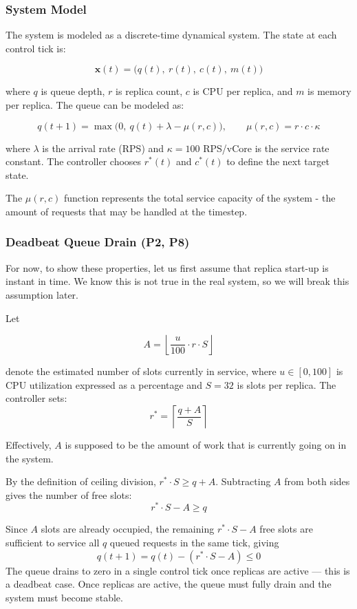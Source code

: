 \documentclass[twocolumn]{article}
\begin{document}
\subsubsection{System Model}
\label{sec:orge0f0fcd}

The system is modeled as a discrete-time dynamical system. The state at each control tick is:

$$\mathbf{x}(t) = \bigl(q(t),\ r(t),\ c(t),\ m(t)\bigr)$$

where \(q\) is queue depth, \(r\) is replica count, \(c\) is CPU per replica, and \(m\) is memory per replica. The queue can be modeled as:

$$q(t+1) = \max\bigl(0,\ q(t) + \lambda - \mu(r,c)\bigr), \qquad \mu(r,c) = r \cdot c \cdot \kappa$$

where \(\lambda\) is the arrival rate (RPS) and \(\kappa = 100\) RPS/vCore is the service rate constant. The controller chooses \(r^*(t)\) and \(c^*(t)\) to define the next target state.

The \(\mu(r, c)\) function represents the total service capacity of the system - the amount of requests that may be handled at the timestep.
\subsubsection{Deadbeat Queue Drain (P2, P8)}
\label{sec:org8e52547}
\label{sec:deadbeat}

For now, to show these properties, let us first assume that replica start-up is instant in time. We know this is not true in the real system, so we will break this assumption later.

Let

$$A = \left\lfloor \frac{u}{100} \cdot r \cdot S \right\rfloor$$

denote the estimated number of slots currently in service, where \(u \in [0, 100]\) is CPU utilization expressed as a percentage and \(S = 32\) is slots per replica. The controller sets:
$$r^* = \left\lceil \frac{q + A}{S} \right\rceil$$

Effectively, \(A\) is supposed to be the amount of work that is currently going on in the system.

By the definition of ceiling division, \(r^* \cdot S \geq q + A\). Subtracting \(A\) from both sides gives the number of free slots:
$$r^* \cdot S - A \geq q$$

Since \(A\) slots are already occupied, the remaining \(r^* \cdot S - A\) free slots are sufficient to service all \(q\) queued requests in the same tick, giving
$$q(t+1) = q(t) - (r^* \cdot S - A) \leq 0$$
The queue drains to zero in a single control tick once replicas are active --- this is a deadbeat case. Once replicas are active, the queue must fully drain and the system must become stable.
\end{document}
